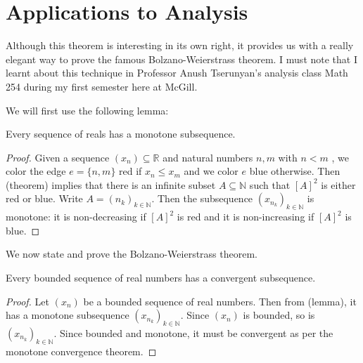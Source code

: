 \section{Applications to Analysis}
Although this theorem is interesting in its own right, it provides us with a really elegant way to prove the famous Bolzano-Weierstrass theorem. I must note that I learnt about this technique in Professor Anush Tserunyan's analysis class Math 254 during my first semester here at McGill.

We will first use the following lemma:
\begin{lemma}
Every sequence of reals has a monotone subsequence.
\end{lemma}
\begin{proof}
	Given a sequence \( (x_{n}) \subseteq \mathbb{R} \) and natural numbers \( n , m  \) with \( n < m \) , we color the edge \( e = \{n , m \}  \) red if \( x_{n} \leq x_{m}  \) and we color \( e \) blue otherwise. Then (theorem) implies that there is an infinite subset \( A \subseteq \mathbb{N}  \) such that \( [A]^{2}  \) is either red or blue. Write \( A = (n_{k} )_{k \in \mathbb{N} }  \). Then the subsequence \( (x_{n_{k} })_{k \in \mathbb{N}}  \) is monotone: it is non-decreasing if \( [A]^{2}  \) is red and it is non-increasing if \( [A]^{2}  \) is blue.
\end{proof}
We now state and prove the Bolzano-Weierstrass theorem.
\begin{theorem}
Every bounded sequence of real numbers has a convergent subsequence.
\end{theorem}
\begin{proof}
Let \( (x_{n}) \) be a bounded sequence of real numbers. Then from (lemma), it has a monotone subsequence \( (x_{n_{k} })_{k \in \mathbb{N} } \). Since \( (x_{n}) \) is bounded, so is \( (x_{n_{k} })_{k \in \mathbb{N}}  \). Since bounded and monotone, it must be convergent as per the monotone convergence theorem.
\end{proof}
